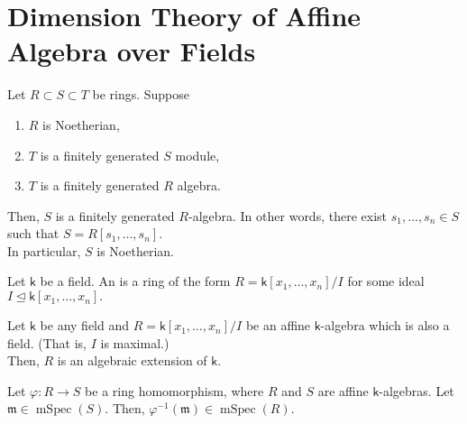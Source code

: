 \documentclass[12pt]{article}	%
\DeclareMathOperator{\mSpec}{mSpec}
\begin{document}
\section{Dimension Theory of Affine Algebra over Fields}

\begin{lem}
	Let $R \subset S \subset T$ be rings. Suppose
	\begin{enumerate}
		\item $R$ is Noetherian,
		\item $T$ is a finitely generated $S$ module,
		\item $T$ is a finitely generated $R$ algebra.
	\end{enumerate}
	\begin{center}
	\end{center}
	Then, $S$ is a finitely generated $R$-algebra. In other words, there exist $s_1, \ldots, s_n \in S$ such that $S = R[s_1, \ldots, s_n].$\\
	In particular, $S$ is Noetherian.
\end{lem}

\begin{defn}%
	Let $\mathsf{k}$ be a field. An  is a ring of the form $R = \mathsf{k}[x_1, \ldots, x_n]/I$ for some ideal $I \unlhd \mathsf{k}[x_1, \ldots, x_n].$
\end{defn}

\begin{lem}[Zariski] 
	Let $\mathsf{k}$ be any field and $R = \mathsf{k}[x_1, \ldots, x_n]/I$ be an affine $\mathsf{k}$-algebra which is also a field. \hfill{\color{ForestGreen}(That is, $I$ is maximal.)} \\
	Then, $R$ is an algebraic extension of $\mathsf{k}.$
\end{lem}

\begin{cor}
	Let $\varphi : R \to S$ be a ring homomorphism, where $R$ and $S$ are affine $\mathsf{k}$-algebras. Let $\mathfrak{m} \in \mSpec(S).$ Then, $\varphi^{-1}(\mathfrak{m}) \in \mSpec(R).$
\end{cor}
\end{document}
